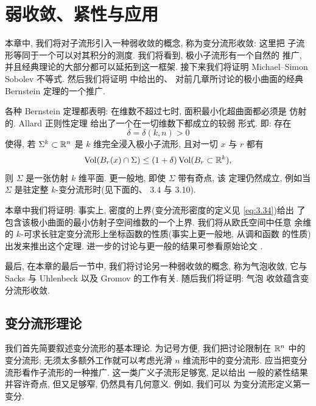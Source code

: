 \chapter{弱收敛、紧性与应用}
\label{chap:3}

本章中, 我们将对子流形引入一种弱收敛的概念, 称为变分流形收敛: 这里把
子流形等同于一个可以对其积分的测度. 我们将看到, 极小子流形有一个自然的
推广, 并且经典理论的大部分都可以延拓到这一框架. 接下来我们将证明
Michael--Simon Sobolev 不等式. 然后我们将证明 \cite{CM16} 中给出的、
对前几章所讨论的极小曲面的经典 Bernstein 定理的一个推广.

各种 Bernstein 定理都表明: 在维数不超过七时, 面积最小化超曲面都必须是
仿射的. Allard 正则性定理 \cite{Al1} 给出了一个在一切维数下都成立的较弱
形式. 即: 存在
\begin{equation}
\delta=\delta(k,n)>0
\label{eq:3.1}
\end{equation}
使得, 若 $\Sigma^k\subset\mathbb{R}^n$ 是 $k$ 维完全浸入极小子流形, 且对一切 $x$
与 $r$ 都有
\begin{equation}
\operatorname{Vol}(B_r(x)\cap\Sigma)\leq(1+\delta)\operatorname{Vol}(B_r\subset\mathbb{R}^k),
\label{eq:3.2}
\end{equation}
则 $\Sigma$ 是一张仿射 $k$ 维平面. 更一般地, 即使 $\Sigma$ 带有奇点, 该
定理仍然成立, 例如当 $\Sigma$ 是驻定整 $k$-变分流形时(见下面的、
3.4 与 3.10).

本章中我们将证明: 事实上, 密度的上界(变分流形密度的定义见 \eqref{eq:3.34})给出
了包含该极小曲面的最小仿射子空间维数的一个上界. 我们将从欧氏空间中任意
余维的 $k$-可求长驻定变分流形上坐标函数的性质(事实上更一般地, 从调和函数
的性质)出发来推出这个定理. 进一步的讨论与更一般的结果可参看原始论文
\cite{CM16}.

最后, 在本章的最后一节中, 我们将讨论另一种弱收敛的概念, 称为气泡收敛,
它与 Sacks 与 Uhlenbeck 以及 Gromov 的工作有关. 随后我们将证明: 气泡
收敛蕴含变分流形收敛.

\section{变分流形理论}
\label{sec:3.1}

我们首先简要叙述变分流形的基本理论. 为记号方便, 我们把讨论限制在 $\mathbb{R}^n$
中的变分流形; 无须太多额外工作就可以考虑光滑 $n$ 维流形中的变分流形.
应当把变分流形看作子流形的一种推广. 这一类广义子流形足够宽, 足以给出
一般的紧性结果并容许奇点, 但又足够窄, 仍然具有几何意义. 例如, 我们可以
为变分流形定义第一变分.

